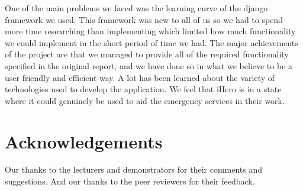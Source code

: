 \documentclass{sig-alt-release2}
\begin{document}
One of the main problems we faced was the learning curve of the django framework we used. This framework was new to all of us so we had to spend more time researching than implementing which limited how much functionality we could implement in the short period of time we had. The major achievements of the project are that we managed to provide all of the required functionality specified in the original report, and we have done so in what we believe to be a user friendly and efficient way. A lot has been learned about the variety of technologies used to develop the application. We feel that iHero is in a state where it could genuinely be used to aid the emergency services in their work. 

\section{Acknowledgements}
Our thanks to the lecturers and demonstrators for their comments and suggestions. And our thanks to the peer reviewers for their feedback.



\end{document}
